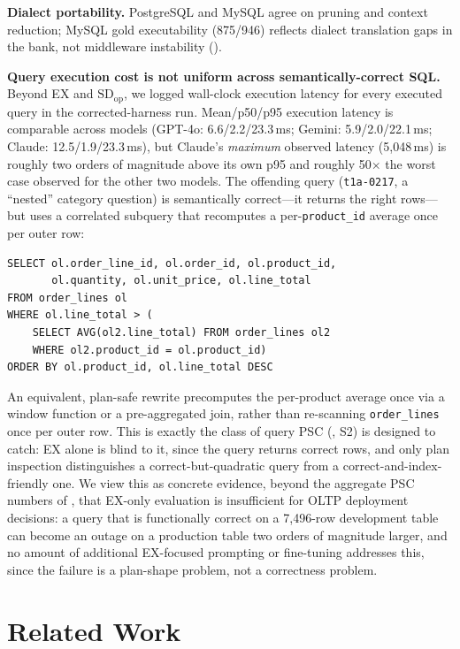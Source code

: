 \documentclass[twocolumn]{svjour3}
\begin{document}
\textbf{Dialect portability.}
PostgreSQL and MySQL agree on pruning and context reduction; MySQL gold executability (875/946) reflects dialect translation gaps in the bank, not middleware instability ().

\textbf{Query execution cost is not uniform across semantically-correct SQL.}
Beyond EX and $\text{SD}_{\text{op}}$, we logged wall-clock execution latency for every executed query in the corrected-harness run.
Mean/p50/p95 execution latency is comparable across models (GPT-4o: 6.6/2.2/23.3\,ms; Gemini: 5.9/2.0/22.1\,ms; Claude: 12.5/1.9/23.3\,ms), but Claude's \emph{maximum} observed latency (5{,}048\,ms) is roughly two orders of magnitude above its own p95 and roughly 50$\times$ the worst case observed for the other two models.
The offending query (\texttt{t1a-0217}, a ``nested'' category question) is semantically correct---it returns the right rows---but uses a correlated subquery that recomputes a per-\texttt{product\_id} average once per outer row:
\begin{lstlisting}[language={}, basicstyle=\footnotesize\ttfamily, breaklines=true, frame=single, backgroundcolor=\color{gray!5}, rulecolor=\color{gray!40}]
SELECT ol.order_line_id, ol.order_id, ol.product_id,
       ol.quantity, ol.unit_price, ol.line_total
FROM order_lines ol
WHERE ol.line_total > (
    SELECT AVG(ol2.line_total) FROM order_lines ol2
    WHERE ol2.product_id = ol.product_id)
ORDER BY ol.product_id, ol.line_total DESC
\end{lstlisting}
An equivalent, plan-safe rewrite precomputes the per-product average once via a window function or a pre-aggregated join, rather than re-scanning \texttt{order\_lines} once per outer row.
This is exactly the class of query PSC (, S2) is designed to catch: EX alone is blind to it, since the query returns correct rows, and only plan inspection distinguishes a correct-but-quadratic query from a correct-and-index-friendly one.
We view this as concrete evidence, beyond the aggregate PSC numbers of , that EX-only evaluation is insufficient for OLTP deployment decisions: a query that is functionally correct on a 7{,}496-row development table can become an outage on a production table two orders of magnitude larger, and no amount of additional EX-focused prompting or fine-tuning addresses this, since the failure is a plan-shape problem, not a correctness problem.

\section{Related Work}
\label{sec:related}
\end{document}
